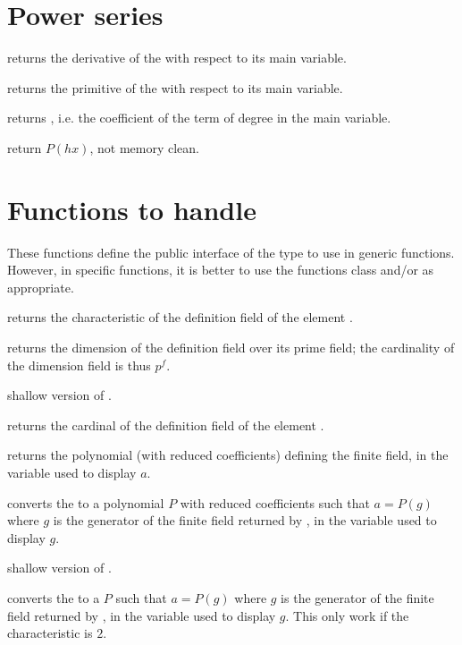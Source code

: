 \section{Power series}

 returns the derivative of the  
with respect to its main variable.

 returns the primitive of the  
with respect to its main variable.

 returns , i.e.
the coefficient of the term of degree  in the main variable.

 return $P(h x)$, not memory clean.

\section{Functions to handle }
These functions define the public interface of the  type to use in
generic functions.  However, in specific functions, it is better to use the
functions class  and/or  as appropriate.

 returns the characteristic of the definition field of the
 element .

 returns the dimension of the definition field over
its prime field; the cardinality of the dimension field is thus $p^f$.

 shallow version of .

 returns the cardinal of the definition field of the
 element .

 returns the polynomial (with reduced 
coefficients) defining the finite field, in the variable used to display $a$.

 converts the   to a polynomial
$P$ with reduced  coefficients such that $a=P(g)$ where $g$ is the
generator of the finite field returned by , in the variable used to
display $g$.

 shallow version of .

 converts the   to a 
$P$ such that $a=P(g)$ where $g$ is the generator of the finite field returned
by , in the variable used to display $g$. This only work if the
characteristic is $2$.

